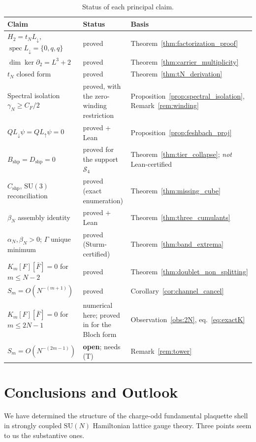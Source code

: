 \documentclass[11pt,a4paper]{article}
\theoremstyle{definition}
\DeclareMathOperator{\spec}{spec}
\newcommand{\CF}{C_F}
\newcommand{\Ldn}{L_{\downarrow}}
\newcommand{\Lup}{L_{\uparrow}}
\newcommand{\SU}{\mathrm{SU}}
\newcommand{\Bshp}{B_{\mathrm{shp}}}
\newcommand{\Cshp}{C_{\mathrm{shp}}}
\newcommand{\Dshp}{D_{\mathrm{shp}}}
\begin{document}
\begin{table}[htbp]
\centering
\caption{Status of each principal claim.}\label{tab:status}
\vspace{0.5em}
\small
\begin{tabular}{@{}p{5.6cm}p{3.1cm}p{5.4cm}@{}}
\toprule
Claim & Status & Basis \\
\midrule
$H_2 = t_N\Ldn$, $\spec\Ldn = \{0,q,q\}$ & proved & Theorem~\ref{thm:factorization_proof} \\
$\dim\ker\partial_2 = L^3+2$ & proved & Theorem~\ref{thm:carrier_multiplicity} \\
$t_N$ closed form & proved & Theorem~\ref{thm:tN_derivation} \\
Spectral isolation $\gamma_N\ge\CF/2$ & proved, with the zero-winding restriction & Proposition~\ref{prop:spectral_isolation}, Remark~\ref{rem:winding} \\
$Q\Ldn\psi = Q\Lup\psi = 0$ & proved + Lean & Proposition~\ref{prop:feshbach_proj} \\
$\Bshp = \Dshp = 0$ & proved for the support $\mathcal{S}_4$ & Theorem~\ref{thm:tier_collapse}; \emph{not} Lean-certified \\
$\Cshp$, $\SU(3)$ reconciliation & proved (exact enumeration) & Theorem~\ref{thm:missing_cube} \\
$\beta_N$ assembly identity & proved + Lean & Theorem~\ref{thm:three_cumulants} \\
$\alpha_N,\beta_N>0$; $\Gamma$ unique minimum & proved (Sturm-certified) & Theorem~\ref{thm:band_extrema} \\
$K_m[F][\bar F] = 0$ for $m\le N-2$ & proved & Theorem~\ref{thm:doublet_non_splitting} \\
$S_m = O(N^{-(m+1)})$ & proved & Corollary~\ref{cor:channel_cancel} \\
$K_m[F][\bar F] = 0$ for $m\le 2N-1$ & numerical here; proved in \cite{Companion2026} for the Bloch form & Observation~\ref{obs:2N}, eq.~\eqref{eq:exactK} \\
$S_m = O(N^{-(2m-1)})$ & \textbf{open}; needs (T) & Remark~\ref{rem:tower} \\
\bottomrule
\end{tabular}
\end{table}

\section{Conclusions and Outlook}\label{sec:conclusion}

We have determined the structure of the charge-odd fundamental plaquette shell in strongly coupled $\SU(N)$ Hamiltonian lattice gauge theory. Three points seem to us the substantive ones.
\end{document}
